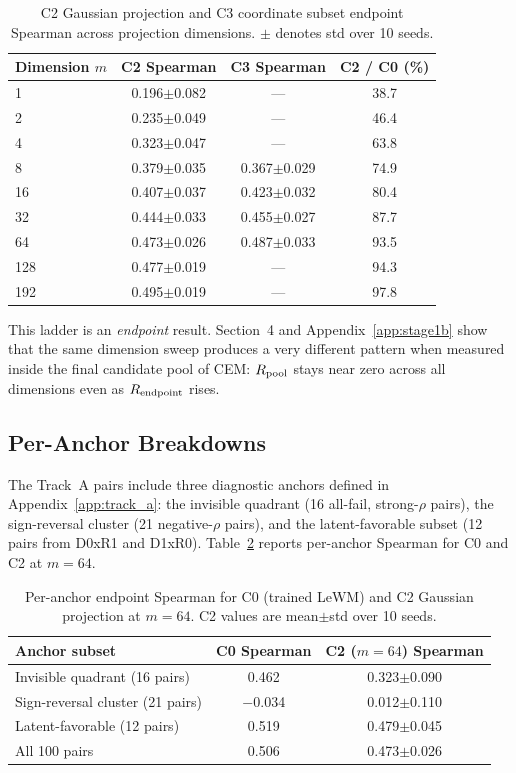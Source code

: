 \begin{table}[h]
\centering
\caption{C2 Gaussian projection and C3 coordinate subset endpoint Spearman
across projection dimensions.  $\pm$ denotes std over 10 seeds.}
\label{tab:c2-ladder}
\begin{tabular}{lccc}
\toprule
Dimension $m$ & C2 Spearman & C3 Spearman & C2 / C0 (\%) \\
\midrule
1 & 0.196$\pm$0.082 & --- & 38.7 \\
2 & 0.235$\pm$0.049 & --- & 46.4 \\
4 & 0.323$\pm$0.047 & --- & 63.8 \\
8 & 0.379$\pm$0.035 & 0.367$\pm$0.029 & 74.9 \\
16 & 0.407$\pm$0.037 & 0.423$\pm$0.032 & 80.4 \\
32 & 0.444$\pm$0.033 & 0.455$\pm$0.027 & 87.7 \\
64 & 0.473$\pm$0.026 & 0.487$\pm$0.033 & 93.5 \\
128 & 0.477$\pm$0.019 & --- & 94.3 \\
192 & 0.495$\pm$0.019 & --- & 97.8 \\
\bottomrule
\end{tabular}
\end{table}

This ladder is an \emph{endpoint} result.  Section~4 and
Appendix~\ref{app:stage1b} show that the same dimension sweep produces a
very different pattern when measured inside the final candidate pool of CEM:
$R_\text{pool}$ stays near zero across all dimensions even as $R_\text{endpoint}$ rises.

\subsection{Per-Anchor Breakdowns}
\label{app:anchor_breakdown}

The Track~A pairs include three diagnostic anchors defined in
Appendix~\ref{app:track_a}: the invisible quadrant (16 all-fail,
strong-$\rho$ pairs), the sign-reversal cluster (21 negative-$\rho$ pairs),
and the latent-favorable subset (12 pairs from D0xR1 and D1xR0).
Table~\ref{tab:anchor-breakdown} reports per-anchor Spearman for C0 and
C2 at $m=64$.

\begin{table}[h]
\centering
\caption{Per-anchor endpoint Spearman for C0 (trained LeWM) and C2 Gaussian
projection at $m=64$.  C2 values are mean$\pm$std over 10 seeds.}
\label{tab:anchor-breakdown}
\begin{tabular}{lcc}
\toprule
Anchor subset & C0 Spearman & C2 ($m\!=\!64$) Spearman \\
\midrule
Invisible quadrant (16 pairs) & 0.462 & 0.323$\pm$0.090 \\
Sign-reversal cluster (21 pairs) & $-$0.034 & 0.012$\pm$0.110 \\
Latent-favorable (12 pairs) & 0.519 & 0.479$\pm$0.045 \\
\midrule
All 100 pairs & 0.506 & 0.473$\pm$0.026 \\
\bottomrule
\end{tabular}
\end{table}

